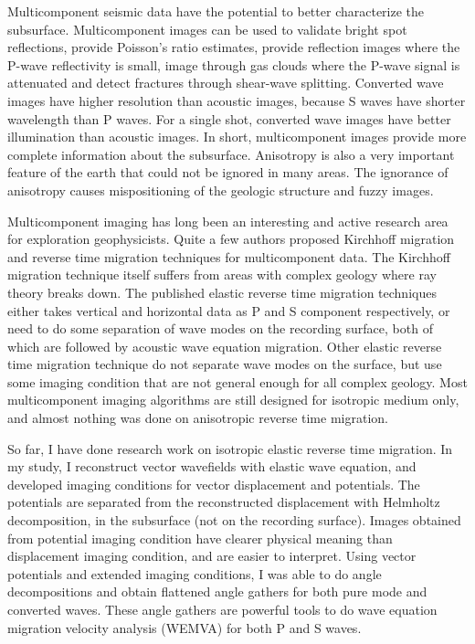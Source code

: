 % 
Multicomponent seismic data have the potential to better characterize the subsurface. Multicomponent images can be used to validate bright spot reflections, provide Poisson's ratio estimates, provide reflection images where the P-wave reflectivity is small, image through gas clouds where the P-wave signal is attenuated and detect fractures through shear-wave splitting. %
Converted wave images have higher resolution than acoustic images, because S waves have shorter wavelength than P waves. For a single shot, converted wave images have better illumination than acoustic images. In short, multicomponent images provide more complete information about the subsurface.
Anisotropy is also a very important feature of the earth that could not be ignored in many areas. The ignorance of anisotropy causes mispositioning of the geologic structure and fuzzy images.%


Multicomponent imaging has long been an interesting and active research area for exploration geophysicists. Quite a few authors proposed Kirchhoff migration and reverse time migration techniques for multicomponent data. The Kirchhoff migration technique itself suffers from areas with complex geology where ray theory breaks down. The published elastic reverse time migration techniques either takes vertical and horizontal data as P and S component respectively, or need to do some separation of wave modes on the recording surface, both of which are followed by acoustic wave equation migration. Other elastic reverse time migration technique do not separate wave modes on the surface, but use some imaging condition that are not general enough for all complex geology. Most multicomponent imaging algorithms are still designed for isotropic medium only, and almost nothing was done on anisotropic reverse time migration.



So far, I have done research work on isotropic elastic reverse time migration. In my study, I reconstruct vector wavefields with elastic wave equation, and developed imaging conditions for vector displacement and potentials. The potentials are separated from the reconstructed displacement with Helmholtz decomposition, in the subsurface (not on the recording surface). Images obtained from potential imaging condition have clearer physical meaning than displacement imaging condition, and are easier to interpret. Using vector potentials and extended imaging conditions, I was able to do angle decompositions and obtain flattened angle gathers for both pure mode and converted waves. These angle gathers are powerful tools to do wave equation migration velocity analysis (WEMVA) for both P and S waves. 

